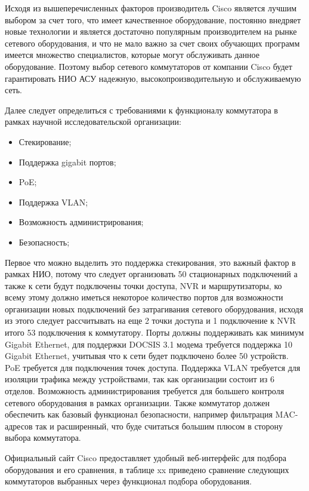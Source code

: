 Исходя из вышеперечисленных факторов производитель Cisco является лучшим выбором за счет того, что имеет качественное оборудование, постоянно внедряет
новые технологии и является достаточно популярным производителем на рынке сетевого оборудования, 
и что не мало важно за счет своих обучающих программ имеется множество специалистов, которые могут обслуживать данное оборудование. 
Поэтому выбор сетевого коммутаторов от компании Cisco будет гарантировать НИО АСУ надежную, высокопроизводительную и обслуживаемую сеть.

Далее следует определиться с требованиями к функционалу коммутатора 
в рамках научной исследовательской организации:

\begin{itemize}
    \item Стекирование;
    \item Поддержка gigabit портов;
    \item PoE;    
    \item Поддержка VLAN;    
    \item Возможность администрирования;    
    \item Безопасность;
\end{itemize}

Первое что можно выделить это поддержка стекирования, это важный фактор в рамках НИО, потому что следует организовать 50 стационарных подключений
а также к сети будут подключены точки доступа, NVR и маршрутизаторы, ко всему этому должно иметься некоторое количество портов для возможности
организации новых подключений без затрагивания сетевого оборудования, исходя из этого следует рассчитывать на еще 2 точки доступа и 1 подключение к NVR итого 53 подключения к коммутатору.
Порты должны поддерживать как минимум Gigabit Ethernet, для поддержки DOCSIS 3.1 модема требуется поддержка 10 Gigabit Ethernet, учитывая что к сети будет подключено более 50 устройств. PoE требуется для подключения точек доступа. 
Поддержка VLAN требуется для изоляции трафика между устройствами, так как организации состоит из 6 отделов.
Возможность администрирования требуется для большего контроля сетевого оборудования в рамках организации.
Также коммутатор должен обеспечить как базовый функционал безопасности, например фильтрация MAC-адресов так и расширенный, что буде считаться большим плюсом в сторону
выбора коммутатора.

Официальный сайт Cisco предоставляет удобный веб-интерфейс для подбора оборудования и его сравнения, в таблице xx приведено сравнение следующих коммутаторов 
выбранных через функционал подбора оборудования.

